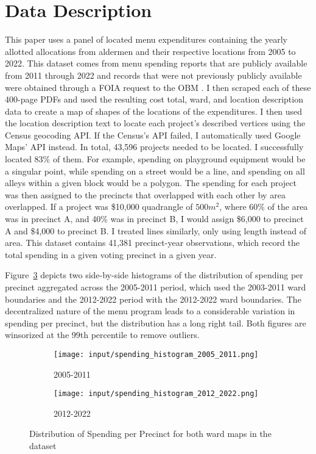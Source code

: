 \section{Data Description}\label{sec:data_description}
This paper uses a panel of located menu expenditures containing the yearly allotted allocations from aldermen and their respective locations from 2005 to 2022. This dataset comes from menu spending reports that are publicly available from 2011 through 2022 and records that were not previously publicly available were obtained through a FOIA request to the OBM \citep{OBM_datasource}.  
I then scraped each of these 400-page PDFs and used the resulting cost total, ward, and location description data to create a map of shapes of the locations of the expenditures. 
I then used the location description text to locate each project’s described vertices using the Census geocoding API.
If the Census's API failed, I automatically used Google Maps' API instead.
In total, 43,596 projects needed to be located.  
I successfully located 83\% of them.
For example, spending on playground equipment would be a singular point, while spending on a street would be a line, and spending on all alleys within a given block would be a polygon.
The spending for each project was then assigned to the precincts that overlapped with each other by area overlapped.
If a project was \$10,000 quadrangle of $500 m^2$, where 60\% of the area was in precinct A, and 40\% was in precinct B, I would assign \$6,000 to precinct A and \$4,000 to precinct B.
I treated lines similarly, only using length instead of area.
This dataset contains 41,381 precinct-year observations, which record the total spending in a given voting precinct in a given year.

Figure~\ref{fig:spending_hist} depicts two side-by-side histograms of the distribution of spending per precinct aggregated across the 2005-2011 period, which used the 2003-2011 ward boundaries and the 2012-2022 period with the 2012-2022 ward boundaries.
The decentralized nature of the menu program leads to a considerable variation in spending per precinct, but the distribution has a long right tail.
Both figures are winsorized at the 99th percentile to remove outliers.

\begin{figure}[H]
    \centering
    \begin{subfigure}[b]{0.45\textwidth} %
      \texttt{[image: input/spending\_histogram\_2005\_2011.png]}
      \caption{2005-2011}
      \label{fig:sub1}
    \end{subfigure}
    \hfill %
    \begin{subfigure}[b]{0.45\textwidth}
      \texttt{[image: input/spending\_histogram\_2012\_2022.png]}
      \caption{2012-2022}
      \label{fig:sub2}
    \end{subfigure}
  
    \caption{Distribution of Spending per Precinct for both ward maps in the dataset}
    \label{fig:spending_hist}
  \end{figure}

